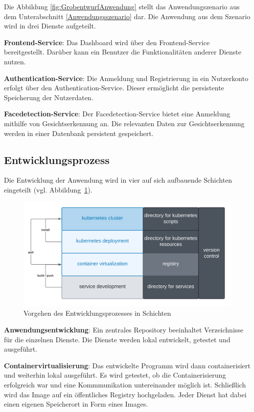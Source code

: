 Die Abbildung \ref{fig:GrobentwurfAnwendung} stellt das Anwendungszenario aus dem Unterabschnitt \ref{Anwendungsszenario} dar.
Die Anwendung aus dem Szenario wird in drei Dienste aufgeteilt.

\textbf{Frontend-Service}: Das Dashboard wird über den Frontend-Service bereitgestellt.
Darüber kann ein Benutzer die Funktionalitäten anderer Dienste nutzen.

\textbf{Authentication-Service}: Die Anmeldung und Registrierung in ein Nutzerkonto erfolgt über den Authentication-Service.
Dieser ermöglicht die persistente Speicherung der Nutzerdaten.

\textbf{Facedetection-Service}: Der Facedetection-Service bietet eine Anmeldung mithilfe von Gesichtserkennung an.
Die relevanten Daten zur Gesichtserkennung werden in einer Datenbank persistent gespeichert.

\subsection{Entwicklungsprozess}

Die Entwicklung der Anwendung wird in vier auf sich aufbauende Schichten eingeteilt (vgl. Abbildung~\ref{fig:Schichtenentwurf}).

\begin{figure}[!htb]
    \centering
    \includegraphics[width=1.0\columnwidth]{images/Schichtenentwurf.png}
    \caption{Vorgehen des Entwicklungsprozesses in Schichten}
    \label{fig:Schichtenentwurf}
  \end{figure}

\textbf{Anwendungsentwicklung}: 
Ein zentrales Repository beeinhaltet Verzeichnisse für die einzelnen Dienste.
Die Dienste werden lokal entwickelt, getestet und ausgeführt.

\textbf{Containervirtualisierung}: 
Das entwickelte Programm wird dann containerisiert und weiterhin lokal ausgeführt.
Es wird getestet, ob die Containerisierung erfolgreich war und eine Kommmunikation untereinander möglich ist. 
Schließlich wird das Image auf ein öffentliches Registry hochgeladen. 
Jeder Dienst hat dabei einen eigenen Speicherort in Form eines Images.


